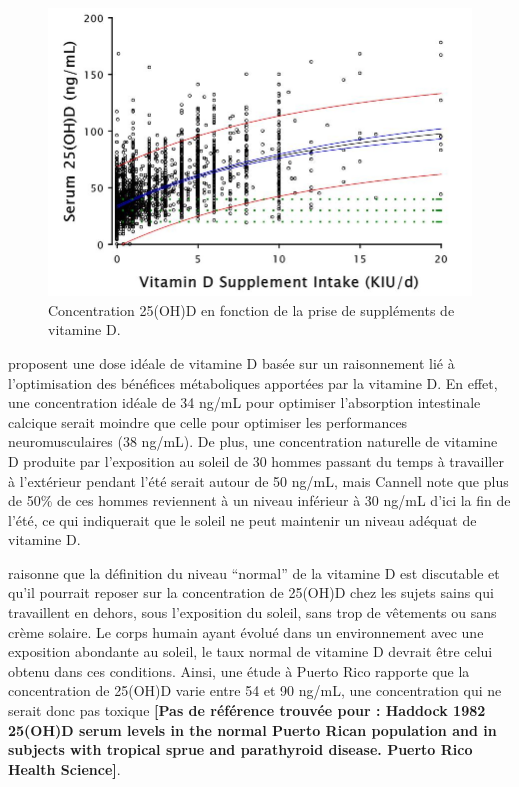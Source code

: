 \documentclass[
  a4paper,
  DIV=11,
  numbers=noendperiod,
  listof=totoc]{scrreprt}
\begin{document}
\begin{figure}
\begin{minipage}[t]{0.58\linewidth}
{{\includegraphics{figures/vd-pk-heaney.jpg}

}

\caption{\label{fig-vd-pk-heaney}Concentration 25(OH)D en fonction de la
prise de suppléments de vitamine D. \textcite{Heaney.2015}}

}

\end{minipage}%

\end{figure}

\textcite{Cannell.2008} proposent une dose idéale de vitamine D basée
sur un raisonnement lié à l'optimisation des bénéfices métaboliques
apportées par la vitamine D. En effet, une concentration idéale de 34
ng/mL pour optimiser l'absorption intestinale calcique serait moindre
que celle pour optimiser les performances neuromusculaires (38 ng/mL).
De plus, une concentration naturelle de vitamine D produite par
l'exposition au soleil de 30 hommes passant du temps à travailler à
l'extérieur pendant l'été serait autour de 50 ng/mL, mais Cannell note
que plus de 50\% de ces hommes reviennent à un niveau inférieur à 30
ng/mL d'ici la fin de l'été, ce qui indiquerait que le soleil ne peut
maintenir un niveau adéquat de vitamine D.

\textcite{Hollis.2005} raisonne que la définition du niveau ``normal''
de la vitamine D est discutable et qu'il pourrait reposer sur la
concentration de 25(OH)D chez les sujets sains qui travaillent en
dehors, sous l'exposition du soleil, sans trop de vêtements ou sans
crème solaire. Le corps humain ayant évolué dans un environnement avec
une exposition abondante au soleil, le taux normal de vitamine D devrait
être celui obtenu dans ces conditions. Ainsi, une étude à Puerto Rico
rapporte que la concentration de 25(OH)D varie entre 54 et 90 ng/mL, une
concentration qui ne serait donc pas toxique \textbf{{[}Pas de référence
trouvée pour : Haddock 1982 25(OH)D serum levels in the normal Puerto
Rican population and in subjects with tropical sprue and parathyroid
disease. Puerto Rico Health Science{]}}.
\end{document}
